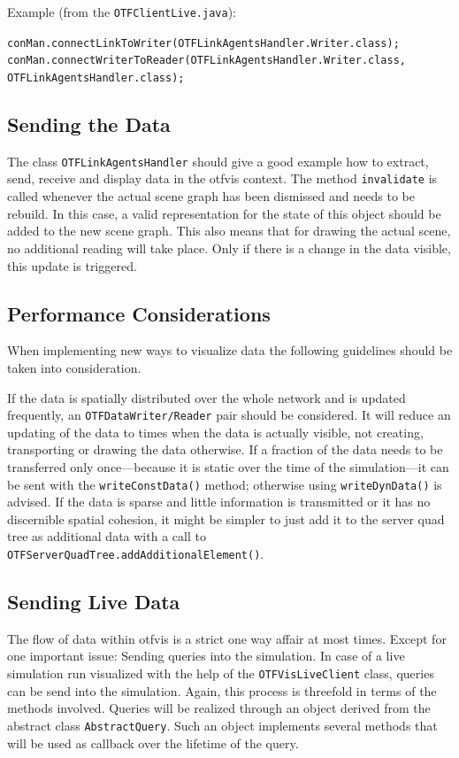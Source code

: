 Example (from the \lstinline|OTFClientLive.java|):

\lstinline|conMan.connectLinkToWriter(OTFLinkAgentsHandler.Writer.class);| \\
\lstinline|conMan.connectWriterToReader(OTFLinkAgentsHandler.Writer.class,|
\lstinline|OTFLinkAgentsHandler.class);|

\subsection{Sending the Data}
The class \lstinline|OTFLinkAgentsHandler| should give a good example how to extract, send, receive and display data in the \gls{otfvis} context. The method \lstinline|invalidate| is called whenever the actual scene graph has been dismissed and needs to be rebuild. 
In this case, a valid representation for the state of this object should be added to the new scene graph. 
This also means that for drawing the actual scene, no additional reading will take place. 
Only if there is a change in the data visible, this update is triggered.

\subsection{Performance Considerations}
When implementing new ways to visualize data the following guidelines should be taken into consideration.

If the data is spatially distributed over the whole network and is updated frequently, an \lstinline|OTFDataWriter/Reader| pair should be considered. 
It will reduce an updating of the data to times when the data is actually visible, not creating, transporting or drawing the data otherwise. If a fraction of the data needs to be transferred only once---because it is static over the time of the simulation---it can be sent with the \lstinline|writeConstData()| method; otherwise using \lstinline|writeDynData()| is advised. 
If the data is sparse and little information is transmitted or it has no discernible spatial cohesion, it might be simpler to just add it to the server quad tree as additional data with a call to \lstinline|OTFServerQuadTree.addAdditionalElement()|. 

\subsection{Sending Live Data}
The flow of data within \gls{otfvis} is a strict one way affair at most times. 
Except for one important issue: Sending queries into the simulation. In case of a live simulation run visualized with the help of the \lstinline|OTFVisLiveClient| class, queries can be send into the simulation. 
Again, this process is threefold in terms of the methods involved. Queries will be realized through an object derived from the abstract class \lstinline|AbstractQuery|. Such an object implements several methods that will be used as callback over the lifetime of the query.

